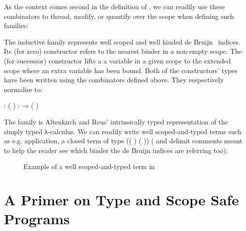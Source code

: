 As the context comes second in the definition of , we
can readily use these combinators to thread, modify, or quantify over the
scope when defining such families:

\begin{minipage}[t]{0.35\textwidth}
\end{minipage}\hfill
\begin{minipage}[t]{0.55\textwidth}
\end{minipage}

The inductive family  represents well scoped and well kinded
de Bruijn~\citeyear{de1972lambda}
indices. Its  (for zero) constructor refers to
the nearest binder in a non-empty scope. The  (for successor) constructor lifts a
a variable in a given scope to the extended scope where
an extra variable has been bound. Both of the constructors' types have been written using the combinators defined above.
They respectively normalise to:
\begin{center}
   : {      ( \AIC{::} )}
  \qquad
   : {    →       ( \AIC{::} )}
\end{center}

The   family  is Altenkirch and Reus'
intrinsically typed representation of the simply typed λ-calculus.
We can readily write well scoped-and-typed terms such as e.g. application,
a closed term of type {((  )  (  ))}
(\AC{\{-} and \AC{-\}} delimit comments meant to help the reader see which
binder the de Bruijn indices are referring too):


\begin{figure}[h]
\label{figure:apply}
\caption{Example of a well scoped-and-typed term in }
\end{figure}




\section{A Primer on Type and Scope Safe Programs}\label{section:primer-program}

